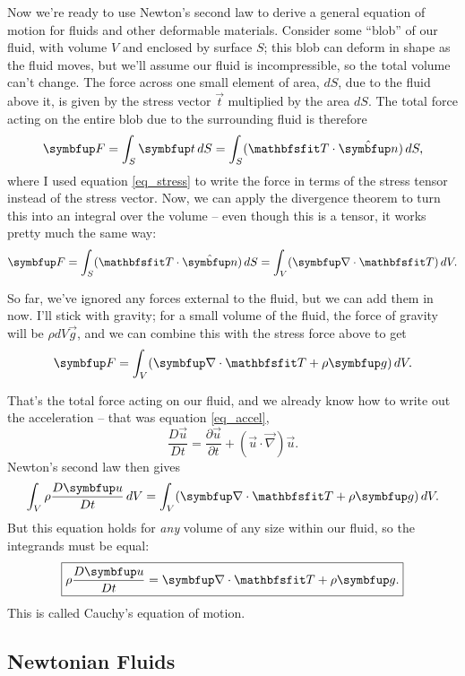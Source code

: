 Now we're ready to use Newton's second law to derive a general equation of motion for fluids and other deformable materials.  Consider some ``blob'' of our fluid, with volume $V$ and enclosed by surface $S$; this blob can deform in shape as the fluid moves, but we'll assume our fluid is incompressible, so the total volume can't change.  The force across one small element of area, $dS$, due to the fluid above it, is given by the stress vector $\vec{t}$ multiplied by the area $dS$.  The total force acting on the entire blob due to the surrounding fluid is therefore
\begin{equation}
\vec{F} = \int_S \vec{t} \, dS = \int_S (\tens{T} \cdot \unit{n}) \, dS,
\end{equation}
where I used equation \ref{eq_stress} to write the force in terms of the stress tensor instead of the stress vector.  Now, we can apply the divergence theorem to turn this into an integral over the volume -- even though this is a tensor, it works pretty much the same way:
\[
\vec{F} =  \int_S (\tens{T} \cdot \unit{n}) \, dS = \int_V (\grad \cdot \tens{T} ) \, dV.
\]

So far, we've ignored any forces external to the fluid, but we can add them in now.  I'll stick with gravity; for a small volume of the fluid, the force of gravity will be $\rho dV \vec{g}$, and we can combine this with the stress force above to get
\[
\vec{F} = \int_V (\grad \cdot \tens{T} + \rho \vec{g} ) \, dV.
\]

That's the total force acting on our fluid, and we already know how to write out the acceleration -- that was equation \ref{eq_accel},
\[
\frac{D \vec{u}}{Dt} = \frac{\partial \vec{u}}{\partial t} + (\vec{u} \cdot \vec{\nabla}) \vec{u}.
\]
Newton's second law then gives
\[
\int_V \rho \frac{D \vec{u}}{Dt} \, dV = \int_V (\grad \cdot \tens{T} + \rho \vec{g} ) \, dV.
\]
But this equation holds for \emph{any} volume of any size within our fluid, so the integrands must be equal:
\begin{equation}
\boxed{
\rho \frac{D \vec{u}}{Dt} =\grad \cdot \tens{T} + \rho \vec{g}.
}
\label{eq_cauchy}
\end{equation}
This is called Cauchy's equation of motion.

\subsection{Newtonian Fluids}


